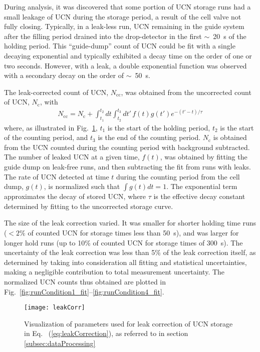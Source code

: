 During analysis, it was discovered that some portion of UCN storage runs had a small leakage of UCN during the storage period, a result of the cell valve not fully closing. Typically, in a leak-less run, UCN remaining in the guide system after the filling period drained into the drop-detector in the first $\sim$~\qty{20}{\s} of the holding period. This ``guide-dump'' count of UCN could be fit with a single decaying exponential and typically exhibited a decay time on the order of one or two seconds. However, with a leak, a double exponential function was observed with a secondary decay on the order of $\sim$~\qty{50}{\s}. 

The leak-corrected count of UCN, $N_\text{cc}$, was obtained from the uncorrected count of UCN, $N_\text{c}$, with
%
\begin{gather}
    N_\text{cc} = N_\text{c} + \int^{t_2}_{t_1} dt \int^{t_3}_{t_2} dt'\, f(t)g(t') e^{-(t'-t)/\tau}\label{eq:leakCorrection}
\end{gather}
%
where, as illustrated in Fig.~\ref{fig:leakCorrection}, $t_1$ is the start of the holding period, $t_2$ is the start of the counting period, and $t_3$ is the end of the counting period. $N_\text{c}$ is obtained from the UCN counted during the counting period with background subtracted. The number of leaked UCN at a given time, $f(t)$, was obtained by fitting the guide dump on leak-free runs, and then subtracting the fit from runs with leaks. The rate of UCN detected at time $t$ during the counting period from the cell dump, $g(t)$, is normalized such that $\int g(t) dt = 1$.  The exponential term approximates the decay of stored UCN, where $\tau$ is the effective decay constant determined by fitting to the uncorrected storage curve.

The size of the leak correction varied. It was smaller for shorter holding time runs ($ < 2\%$ of counted UCN for storage times less than \qty{50}{\s}), and was larger for longer hold runs (up to 10\% of counted UCN for storage times of \qty{300}{\s}). The uncertainty of the leak correction was less than 5\% of the leak correction itself, as determined by taking into consideration all fitting and statistical uncertainties, making a negligible contribution to total measurement uncertainty. The normalized UCN counts thus obtained are plotted in Fig.~\ref{fig:runCondition1_fit}--\ref{fig:runCondition4_fit}.

\begin{figure}
    \centering
    \texttt{[image: leakCorr]}
    \caption[Visualization of parameters used for leak correction of UCN storage in Eq.~ (\ref{eq:leakCorrection})]{Visualization of parameters used for leak correction of UCN storage in Eq.~ (\ref{eq:leakCorrection}), as referred to in section \ref{subsec:dataProcessing}}
    \label{fig:leakCorrection}
\end{figure}


